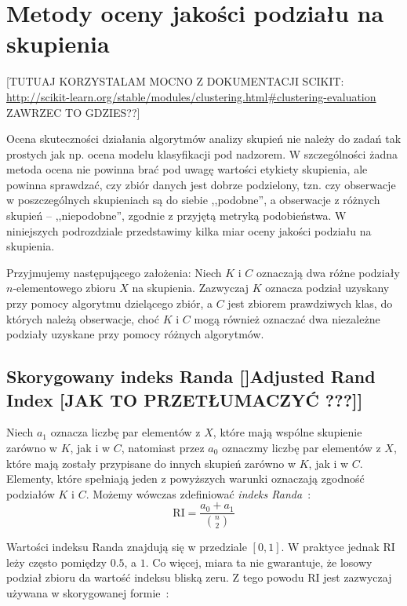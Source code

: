 \documentclass{praca1}
\begin{document}
\section{Metody oceny jakości podziału na skupienia}

[TUTUAJ KORZYSTALAM MOCNO Z DOKUMENTACJI SCIKIT: \url{http://scikit-learn.org/stable/modules/clustering.html#clustering-evaluation}  ZAWRZEC TO GDZIES??]

Ocena skuteczności działania algorytmów analizy skupień nie należy do zadań tak prostych jak np. ocena modelu klasyfikacji pod nadzorem. W szczególności żadna metoda ocena nie powinna brać pod uwagę wartości etykiety skupienia, ale powinna sprawdzać, czy zbiór danych jest dobrze podzielony, tzn. czy obserwacje w poszczególnych skupieniach są do siebie ,,podobne'', a obserwacje z różnych skupień -- ,,niepodobne'', zgodnie z przyjętą metryką podobieństwa. W niniejszych podrozdziale przedstawimy kilka miar oceny jakości podziału na skupienia.

Przyjmujemy następującego założenia: Niech $K$ i $C$ oznaczają dwa różne podziały $n$-elementowego zbioru $X$ na skupienia. Zazwyczaj $K$ oznacza podział uzyskany przy pomocy algorytmu dzielącego zbiór, a $C$ jest zbiorem prawdziwych klas, do których należą obserwacje, choć $K$ i $C$ mogą również oznaczać dwa niezależne podziały uzyskane przy pomocy różnych algorytmów.

\subsection{Skorygowany indeks Randa []Adjusted Rand Index [JAK TO PRZETŁUMACZYĆ ???]]}

Niech $a_1$ oznacza liczbę par elementów z $X$, które mają wspólne skupienie zarówno w $K$, jak i w $C$, natomiast przez $a_0$ oznaczmy liczbę par elementów z $X$, które mają zostały przypisane do innych skupień zarówno w $K$, jak i w $C$. Elementy, które spełniają jeden z powyższych warunki oznaczają zgodność podziałów $K$ i $C$. Możemy wówczas zdefiniować \emph{indeks Randa}~\cite{Rand1971:objective}:
\begin{equation}
\textrm{RI} = \frac{a_0+a_1}{{n \choose 2} }
\end{equation}

Wartości indeksu Randa znajdują się w przedziale $[0,1]$. W praktyce jednak $\textrm{RI}$ leży często pomiędzy $0.5$, a $1$. Co więcej, miara ta nie gwarantuje, że losowy podział zbioru da wartość indeksu bliską zeru. Z tego powodu $\textrm{RI}$ jest zazwyczaj używana w skorygowanej formie~\cite{Lawrence1985:comparing}:
\end{document}
